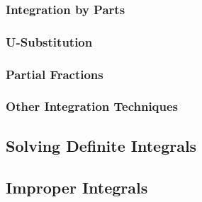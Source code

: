 \documentclass[12pt]{article}
\begin{document}
\subsubsection{Integration by Parts}

\subsubsection{U-Substitution}

\subsubsection{Partial Fractions}

\subsubsection{Other Integration Techniques}

\subsection{Solving Definite Integrals}

\subsection{Improper Integrals}
\end{document}
